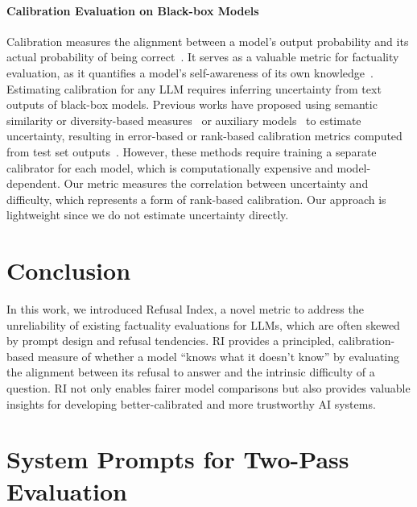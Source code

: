 \documentclass{article} %
\theoremstyle{definition}
\begin{document}
\paragraph{Calibration Evaluation on Black-box Models}

Calibration measures the alignment between a model's output probability and its actual probability of being correct~\citep{guo2017calibration}. It serves as a valuable metric for factuality evaluation, as it quantifies a model's self-awareness of its own knowledge~\citep{kadavath2022mostly, yin-etal-2023-selfaware, agrawal2023hallucinating}. Estimating calibration for any LLM requires inferring uncertainty from text outputs of black-box models. Previous works have proposed using semantic similarity or diversity-based measures~\citep{kuhn-etal-2023-semantic, farquhar-etal-2024-semantic} or auxiliary models~\citep{ulmer-etal-2024-calibrating} to estimate uncertainty, resulting in error-based or rank-based calibration metrics computed from test set outputs~\citep{huang-etal-2024-rank}. However, these methods require training a separate calibrator for each model, which is computationally expensive and model-dependent.
Our metric measures the correlation between uncertainty and difficulty, which represents a form of rank-based calibration. Our approach is lightweight since we do not estimate uncertainty directly.

\section{Conclusion}

In this work, we introduced Refusal Index, a novel metric to address the unreliability of existing factuality evaluations for LLMs, which are often skewed by prompt design and refusal tendencies. RI provides a principled, calibration-based measure of whether a model ``knows what it doesn't know'' by evaluating the alignment between its refusal to answer and the intrinsic difficulty of a question.  RI not only enables fairer model comparisons but also provides valuable insights for developing better-calibrated and more trustworthy AI systems.




\appendix

\section{System Prompts for Two-Pass Evaluation}
\label{app:system_prompts}
\end{document}
